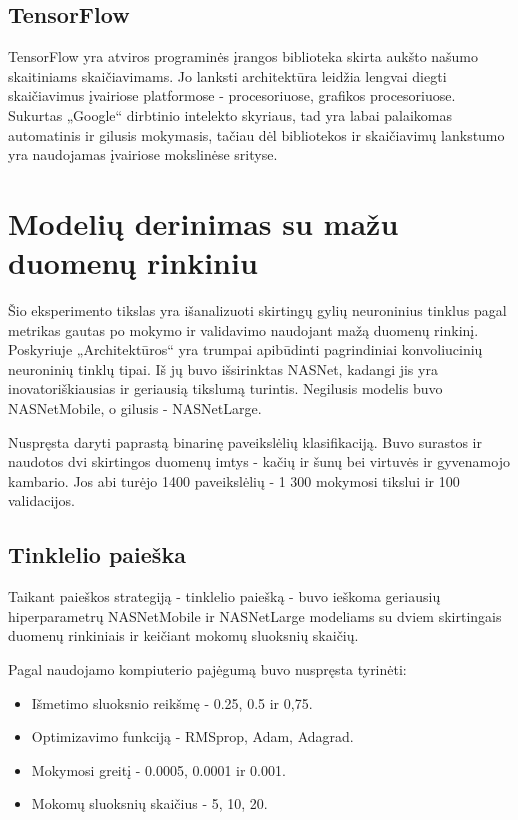 \documentclass{VUMIFPSbakalaurinis}
\begin{document}
\subsection{TensorFlow}
TensorFlow yra atviros programinės įrangos biblioteka skirta aukšto našumo skaitiniams skaičiavimams. Jo lanksti architektūra leidžia lengvai diegti skaičiavimus įvairiose 
platformose - procesoriuose, grafikos procesoriuose. Sukurtas „Google“ dirbtinio intelekto skyriaus, tad yra labai palaikomas automatinis ir gilusis mokymasis, tačiau 
dėl bibliotekos ir skaičiavimų lankstumo yra naudojamas įvairiose mokslinėse srityse.

\section{Modelių derinimas su mažu duomenų rinkiniu} 
Šio eksperimento tikslas yra išanalizuoti skirtingų gylių neuroninius tinklus pagal metrikas gautas po mokymo ir validavimo naudojant mažą duomenų rinkinį. 
Poskyriuje „Architektūros“ yra trumpai apibūdinti pagrindiniai konvoliucinių neuroninių tinklų tipai. 
Iš jų buvo išsirinktas NASNet, kadangi jis yra inovatoriškiausias ir geriausią tikslumą turintis. Negilusis modelis buvo NASNetMobile, o gilusis - NASNetLarge.

Nuspręsta daryti paprastą binarinę paveikslėlių klasifikaciją.
Buvo surastos ir naudotos dvi skirtingos duomenų imtys - kačių ir šunų bei virtuvės ir gyvenamojo kambario. Jos abi turėjo 1400 paveikslėlių - 1 300 mokymosi tikslui ir 100 validacijos.

\subsection{Tinklelio paieška}

Taikant paieškos strategiją - tinklelio paiešką - buvo ieškoma geriausių hiperparametrų NASNetMobile ir NASNetLarge modeliams su dviem skirtingais duomenų rinkiniais ir keičiant mokomų sluoksnių skaičių.

Pagal naudojamo kompiuterio pajėgumą buvo nuspręsta tyrinėti:
\begin{itemize}
    \item Išmetimo sluoksnio reikšmę - 0.25, 0.5 ir 0,75.
    \item Optimizavimo funkciją - RMSprop, Adam, Adagrad.
    \item Mokymosi greitį - 0.0005, 0.0001 ir 0.001.
    \item Mokomų sluoksnių skaičius - 5, 10, 20.
\end{itemize}
\end{document}
